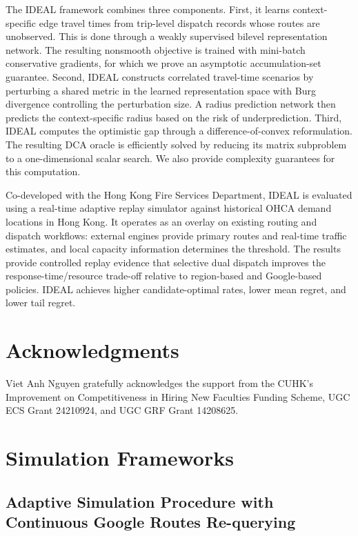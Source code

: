 \documentclass[11pt, letterpaper, oneside, reqno]{amsart}
\begin{document}
The IDEAL framework combines three components. First, it learns context-specific edge travel times from trip-level dispatch records whose routes are unobserved. This is done through a weakly supervised bilevel representation network. The resulting nonsmooth objective is trained with mini-batch conservative gradients, for which we prove an asymptotic accumulation-set guarantee.
Second, IDEAL constructs correlated travel-time scenarios by perturbing a shared metric in the learned representation space with Burg divergence controlling the perturbation size. A radius prediction network then predicts the context-specific radius based on the risk of underprediction.
Third, IDEAL computes the optimistic gap through a difference-of-convex reformulation. The resulting DCA oracle is efficiently solved by reducing its matrix subproblem to a one-dimensional scalar search. We also provide complexity guarantees for this computation.

Co-developed with the Hong Kong Fire Services Department, IDEAL is evaluated using a real-time adaptive replay simulator against historical OHCA demand locations in Hong Kong. It operates as an overlay on existing routing and dispatch workflows: external engines provide primary routes and real-time traffic estimates, and local capacity information determines the threshold. The results provide controlled replay evidence that selective dual dispatch improves the response-time/resource trade-off relative to region-based and Google-based policies. IDEAL achieves higher candidate-optimal rates, lower mean regret, and lower tail regret.

\section*{Acknowledgments}
Viet Anh Nguyen gratefully acknowledges the support from the CUHK’s Improvement on Competitiveness in Hiring New Faculties Funding Scheme, UGC ECS Grant 24210924, and UGC GRF Grant 14208625.


\newpage




\newpage
\appendix
\section{Simulation Frameworks} \label{ec:simulation-frameworks}

\subsection{Adaptive Simulation Procedure with Continuous Google Routes Re-querying}
\label{ec:adaptive-simulation}
\end{document}
